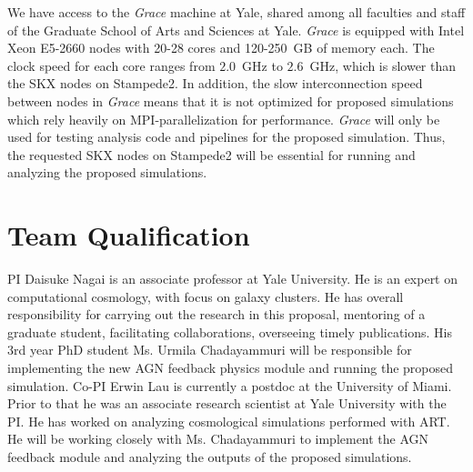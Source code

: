 \documentclass[letterpaper,11pt]{article}
\begin{document}

We have access to the {\em Grace} machine at Yale, shared among all faculties and staff of the Graduate School of Arts and Sciences at Yale. {\em Grace} is equipped with Intel Xeon E5-2660 nodes with 20-28 cores and 120-250~GB of memory each. The clock speed for each core ranges from $2.0$~GHz to $2.6$~GHz, which is slower than the SKX nodes on Stampede2. In addition, the slow interconnection speed between nodes in {\em Grace} means that it is not optimized for proposed simulations which rely heavily on MPI-parallelization for performance. {\em Grace} will only be used for testing analysis code and pipelines for the proposed simulation. 
Thus, the requested SKX nodes on Stampede2 will be essential for running and analyzing the proposed simulations.

\section{Team Qualification}
PI Daisuke Nagai is an associate professor at Yale University. He is an expert on computational cosmology, with focus on galaxy clusters. He has overall responsibility for carrying out the research in this proposal,
mentoring of a graduate student, facilitating collaborations,
overseeing timely publications.
His 3rd year PhD student Ms. Urmila Chadayammuri will be responsible for implementing the new AGN feedback physics module and running the proposed simulation.    
Co-PI Erwin Lau is currently a postdoc at the University of Miami. Prior to that he was an associate research scientist at Yale University with the PI. He has worked on analyzing cosmological simulations performed with ART. He will be working closely with Ms. Chadayammuri to implement the AGN feedback module and analyzing the outputs of the proposed simulations.



\end{document}
